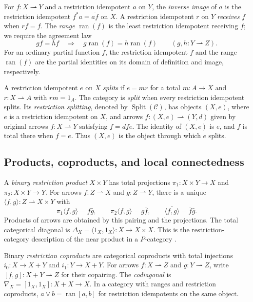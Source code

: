 \documentclass[11pt]{article}
\newcommand{\ran}{\operatorname{ran}}
\begin{document}
For $f:X\rightharpoonup Y$ and a restriction idempotent $a$ on $Y$,
the \emph{inverse image} of $a$ is the restriction idempotent
$f^*a=\overline{af}$ on $X$.
A restriction idempotent $r$ on $Y$ \emph{receives} $f$ when $rf=f$.
The \emph{range} $\ran(f)$ is the least restriction idempotent receiving $f$;
we require the agreement law
\[
 gf=hf\quad\Longrightarrow\quad
 g\ran(f)=h\ran(f)
 \qquad(g,h:Y\rightharpoonup Z).
\]
For an ordinary partial function $f$, the restriction idempotent
$\bar f$ and the range $\ran(f)$ are the partial identities on its
domain of definition and image, respectively.

A restriction idempotent $e$ on $X$ \emph{splits} if
$e=mr$ for a total $m:A\to X$ and $r:X\rightharpoonup A$
with $rm=1_A$. The category is \emph{split} when every restriction
idempotent splits.
Its \emph{restriction splitting}, denoted by
$\operatorname{Split}(\mathcal C)$, has objects $(X,e)$, where $e$ is a
restriction idempotent on $X$, and arrows
$f:(X,e)\rightharpoonup(Y,d)$ given by original arrows
$f:X\rightharpoonup Y$ satisfying $f=dfe$.
The identity of $(X,e)$ is $e$, and $f$ is total there when
$\bar f=e$. Thus $(X,e)$ is the object through which $e$ splits.

\subsection{Products, coproducts, and local connectedness}

A \emph{binary restriction product} $X\times Y$ has total
projections $\pi_1:X\times Y\to X$ and $\pi_2:X\times Y\to Y$.
For arrows $f:Z\rightharpoonup X$ and $g:Z\rightharpoonup Y$,
there is a unique $\langle f,g\rangle:Z\rightharpoonup X\times Y$
with
\[
 \pi_1\langle f,g\rangle=f\bar g,\qquad
 \pi_2\langle f,g\rangle=g\bar f,\qquad
 \overline{\langle f,g\rangle}=\bar f\bar g.
\]
Products of arrows are obtained by this pairing and the projections.
The total categorical diagonal is
$\Delta_X=\langle1_X,1_X\rangle:X\to X\times X$.
This is the restriction-category description of the near product
in a $P$-category \cite{Rosolini,CockettLack}.

Binary \emph{restriction coproducts} are categorical coproducts with
total injections $i_0:X\to X+Y$ and $i_1:Y\to X+Y$.
For arrows $f:X\rightharpoonup Z$ and $g:Y\rightharpoonup Z$,
write $[f,g]:X+Y\rightharpoonup Z$ for their copairing.
The \emph{codiagonal} is
$\nabla_X=[1_X,1_X]:X+X\to X$.
In a category with ranges and restriction coproducts,
$a\vee b=\ran[a,b]$ for restriction idempotents on the same object.
\end{document}
